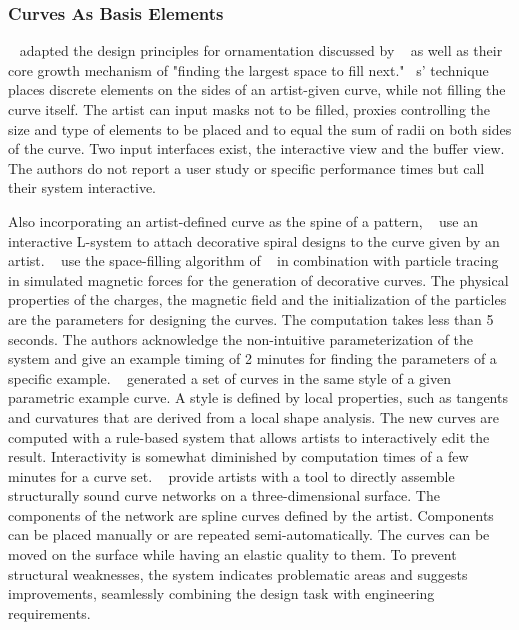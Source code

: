 
\subsubsection[As Basis Elements]{Curves As Basis Elements}
\label{subsubsec:analysis_curves}

\citeauthor*{anderson_2008_udt}~\cite{anderson_2008_udt} adapted the design principles for ornamentation discussed by \citeauthor*{wong_1998_cgf}~\cite{wong_1998_cgf} as well as their core growth mechanism of "finding the largest space to fill next."  \citeauthor*{anderson_2008_udt}~\cite{anderson_2008_udt}s' technique places discrete elements on the sides of an artist-given curve, while not filling the curve itself. The artist can input masks not to be filled, proxies controlling the size and type of elements to be placed and to equal the sum of radii on both sides of the curve. Two input interfaces exist, the interactive view and the buffer view. The authors do not report a user study or specific performance times but call their system interactive.  

Also incorporating an artist-defined curve as the spine of a pattern, \citeauthor*{yu_2012_ans}~\cite{yu_2012_ans} use an interactive L-system to attach decorative spiral designs to the curve given by an artist.
\citeauthor*{xu_2009_mcc}~\cite{xu_2009_mcc} use the space-filling algorithm of \citeauthor*{wong_1998_cgf}~\cite{wong_1998_cgf} in combination with particle tracing in simulated magnetic forces for the generation of decorative curves. The physical properties of the charges, the magnetic field and the initialization of the particles are the parameters for designing the curves. The computation takes less than 5 seconds. The authors acknowledge the non-intuitive parameterization of the system and give an example timing of 2 minutes for finding the parameters of a specific example.
\citeauthor*{merrell_2010_ecs}~\cite{merrell_2010_ecs} generated a set of curves in the same style of a given parametric example curve. A style is defined by local properties, such as tangents and curvatures that are derived from a local shape analysis. The new curves are computed with a rule-based system that allows artists to interactively edit the result. Interactivity is somewhat diminished by computation times of a few minutes for a curve set.
\citeauthor*{zehnder_2016_dso}~\cite{zehnder_2016_dso} provide artists with a tool to directly assemble structurally sound curve networks on a three-dimensional surface. The components of the network are spline curves defined by the artist. Components can be placed manually or are repeated semi-automatically. The curves can be moved on the surface while having an elastic quality to them. To prevent structural weaknesses, the system indicates problematic areas and suggests improvements, seamlessly combining the design task with engineering requirements.

